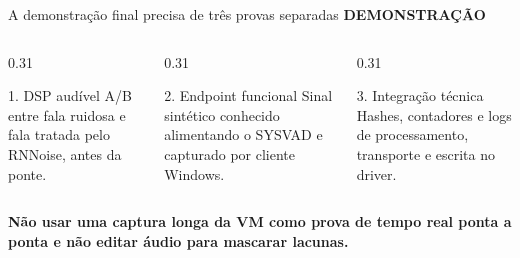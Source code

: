 \documentclass[aspectratio=169,10pt]{beamer}
\newcommand{\kicker}[1]{%
    {\color{signalorange}\scriptsize\bfseries\MakeUppercase{#1}}\par\vspace{0.08cm}
}
\begin{document}
\begin{frame}{A demonstração final precisa de três provas separadas}
    \kicker{Demonstração}
    \begin{columns}[T,onlytextwidth]
        \begin{column}{0.31\textwidth}
            \begin{block}{1. DSP audível}
                A/B entre fala ruidosa e fala tratada pelo RNNoise, antes da
                ponte.
            \end{block}
        \end{column}
        \begin{column}{0.31\textwidth}
            \begin{block}{2. Endpoint funcional}
                Sinal sintético conhecido alimentando o SYSVAD e capturado por
                cliente Windows.
            \end{block}
        \end{column}
        \begin{column}{0.31\textwidth}
            \begin{block}{3. Integração técnica}
                Hashes, contadores e logs de processamento, transporte e
                escrita no driver.
            \end{block}
        \end{column}
    \end{columns}

    \vspace{0.42cm}
    \centering
    \colorbox{alertred!10}{%
        \parbox{0.91\textwidth}{\centering
        \textcolor{alertred}{\textbf{Não usar uma captura longa da VM como
        prova de tempo real ponta a ponta e não editar áudio para mascarar
        lacunas.}}}}
\end{frame}
\end{document}
